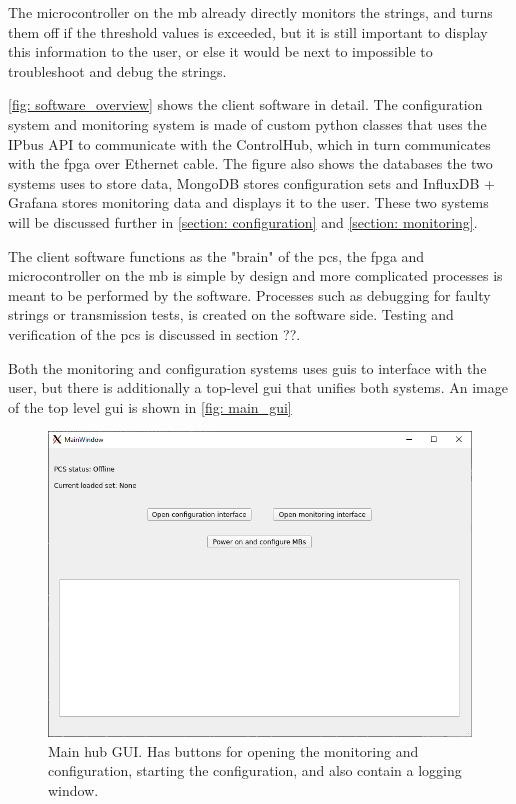 \documentclass[main.tex]{subfiles}
\begin{document}
The microcontroller on the \gls{mb} already directly monitors the strings, and turns them off if the threshold values is exceeded, but it is still important to display this information to the user, or else it would be next to impossible to troubleshoot and debug the strings.

\autoref{fig: software_overview} shows the client software in detail. The configuration system and monitoring system is made of custom python classes that uses the IPbus API to communicate with the ControlHub, which in turn communicates with the \gls{fpga} over Ethernet cable. The figure also shows the databases the two systems uses to store data, MongoDB stores configuration sets and InfluxDB + Grafana stores monitoring data and displays it to the user. These two systems will be discussed further in \autoref{section: configuration} and \autoref{section: monitoring}.

The client software functions as the "brain" of the \gls{pcs}, the \gls{fpga} and microcontroller on the \gls{mb} is simple by design and more complicated processes is meant to be performed by the software. Processes such as debugging for faulty strings or transmission tests, is created on the software side. Testing and verification of the \gls{pcs} is discussed in section ??.
 

Both the monitoring and configuration systems uses \gls{gui}s to interface with the user, but there is additionally a top-level \gls{gui} that unifies both systems. An image of the top level \gls{gui} is shown in \autoref{fig: main_gui}

\begin{figure}[!htpb]
    \centering
    \includegraphics[scale=0.65]{images/main_gui.png}
    \caption{Main hub GUI. Has buttons for opening the monitoring and configuration, starting the configuration, and also contain a logging window.}
    \label{fig: main_gui}
\end{figure}
\FloatBarrier 
\end{document}
